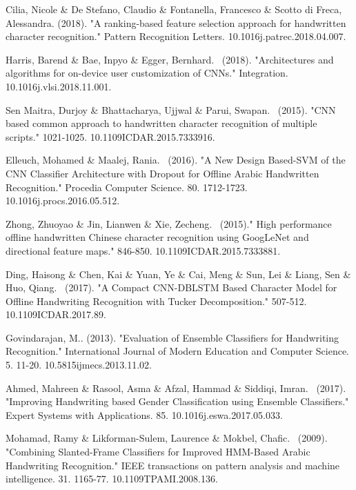 \documentclass{article}
\begin{document}
\begin{thebibliography}{99}
   Cilia, Nicole \& De Stefano, Claudio \& Fontanella, Francesco \& Scotto di Freca, Alessandra. (2018). "A ranking-based feature selection approach for handwritten character recognition." Pattern Recognition Letters. 10.1016\/j.patrec.2018.04.007. 

   Harris, Barend \& Bae, Inpyo \& Egger, Bernhard. \ (2018). "Architectures and algorithms for on-device user customization of CNNs." Integration. 10.1016\/j.vlsi.2018.11.001. 

   Sen Maitra, Durjoy \& Bhattacharya, Ujjwal \& Parui, Swapan. \ (2015). "CNN based common approach to handwritten character recognition of multiple scripts." 1021-1025. 10.1109\/ICDAR.2015.7333916. 

   Elleuch, Mohamed \& Maalej, Rania. \ (2016). "A New Design Based-SVM of the CNN Classifier Architecture with Dropout for Offline Arabic Handwritten Recognition." Procedia Computer Science. 80. 1712-1723. 10.1016\/j.procs.2016.05.512. 

   Zhong, Zhuoyao \& Jin, Lianwen \& Xie, Zecheng. \ (2015)." High performance offline handwritten Chinese character recognition using GoogLeNet and directional feature maps." 846-850. 10.1109\/ICDAR.2015.7333881. 

   Ding, Haisong \& Chen, Kai \& Yuan, Ye \& Cai, Meng \& Sun, Lei \& Liang, Sen \& Huo, Qiang. \ (2017). "A Compact CNN-DBLSTM Based Character Model for Offline Handwriting Recognition with Tucker Decomposition." 507-512. 10.1109\/ICDAR.2017.89. 

   Govindarajan, M.. (2013). "Evaluation of Ensemble Classifiers for Handwriting Recognition." International Journal of Modern Education and Computer Science. 5. 11-20. 10.5815\/ijmecs.2013.11.02. 

   Ahmed, Mahreen \& Rasool, Asma \& Afzal, Hammad \& Siddiqi, Imran. \ (2017). "Improving Handwriting based Gender Classification using Ensemble Classifiers." Expert Systems with Applications. 85. 10.1016\/j.eswa.2017.05.033. 

   Mohamad, Ramy \& Likforman-Sulem, Laurence \& Mokbel, Chafic. \ (2009). "Combining Slanted-Frame Classifiers for Improved HMM-Based Arabic Handwriting Recognition." IEEE transactions on pattern analysis and machine intelligence. 31. 1165-77. 10.1109\/TPAMI.2008.136. 
\end{thebibliography}
\end{document}
